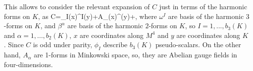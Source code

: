This allows  to consider the relevant expansion of $C$ just in terms of the harmonic forms on $K$, as 
\beq
C=\phi_I(x)\omega^I(y)+A_\alpha(x)\w\beta^\alpha(y)+,
\eeq
where $\omega^I$ are basis of the harmonic $3$-forms on $K$, and $\beta^\alpha$ are basis of the harmonic $2$-forms on $K$, so $I=1,...,b_3(K)$ and $\alpha=1,...,b_2(K)$, $x$ are coordinates along $M^4$ and $y$ are coordinates along $K$. Since $C$ is odd under parity, $\phi_I$ describe $b_3(K)$ pseudo-scalars. On the other hand, $A_\alpha$ are  1-forms in Minkowski space, so, they are Abelian gauge fields in four-dimensions.
